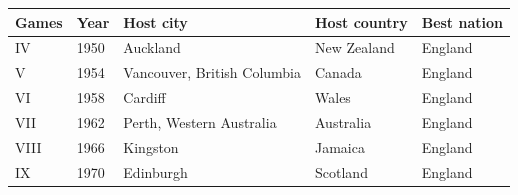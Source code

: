 \documentclass{article}
\begin{document}
\begin{tabular}{lllll}
\toprule
Games & Year & Host city & Host country & Best nation \\
\midrule
IV & 1950 & Auckland & New Zealand & England \\
V & 1954 & Vancouver, British Columbia & Canada & England \\
VI & 1958 & Cardiff & Wales & England \\
VII & 1962 & Perth, Western Australia & Australia & England \\
VIII & 1966 & Kingston & Jamaica & England \\
IX & 1970 & Edinburgh & Scotland & England \\
\bottomrule
\end{tabular}
\end{document}
